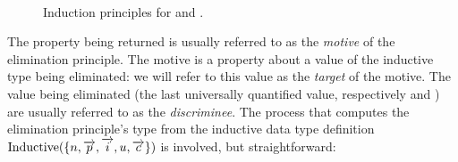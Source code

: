 \begin{figure*}[!htp]
  \caption{ Induction principles for  and . }~\label{list-ind-vec-ind}

\end{figure*}

The property being returned  is usually referred to as the
\textit{motive} of the elimination principle.  The motive is a property about a
value of the inductive type being eliminated: we will refer to this value as the
\textit{target} of the motive.  The value being eliminated (the last
universally quantified value, respectively  and ) are
usually referred to as the \textit{discriminee}.  The process that computes the
elimination principle's type from the inductive data type definition
$\text{Inductive}(\{ n, \overrightarrow{p}, \overrightarrow{i}, u, \overrightarrow{c} \})$
is involved, but straightforward:

